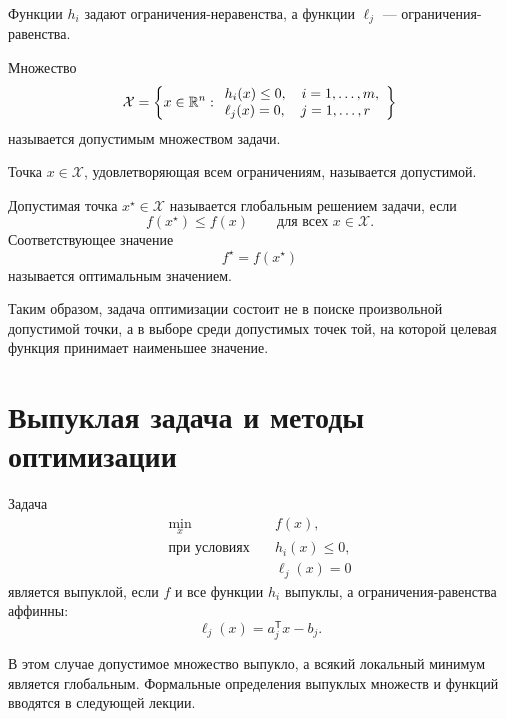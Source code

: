 Функции \(h_i\) задают ограничения-неравенства, а функции
\(\ell_j\) --- ограничения-равенства.

\begin{definition}
Множество
\[
    \mathcal X
    =
    \left\{
        x\in\mathbb{R}^n:
        \begin{array}{l}
            h_i(x)\le0,\quad i=1,\ldots,m,\\
            \ell_j(x)=0,\quad j=1,\ldots,r
        \end{array}
    \right\}
\]
называется допустимым множеством задачи.
\end{definition}

\begin{definition}
Точка \(x\in\mathcal X\), удовлетворяющая всем ограничениям,
называется допустимой.
\end{definition}

\begin{definition}
Допустимая точка \(x^\star\in\mathcal X\) называется глобальным
решением задачи, если
\[
    f(x^\star)\le f(x)
    \qquad
    \text{для всех }x\in\mathcal X.
\]
Соответствующее значение
\[
    f^\star=f(x^\star)
\]
называется оптимальным значением.
\end{definition}

Таким образом, задача оптимизации состоит не в поиске произвольной
допустимой точки, а в выборе среди допустимых точек той, на которой
целевая функция принимает наименьшее значение.

\section{Выпуклая задача и методы оптимизации}

Задача
\[
    \begin{aligned}
        \min_x
        \quad& f(x),
        \\
        \text{при условиях}
        \quad& h_i(x)\le0,
        \\
        & \ell_j(x)=0
    \end{aligned}
\]
является выпуклой, если \(f\) и все функции \(h_i\) выпуклы, а
ограничения-равенства аффинны:
\[
    \ell_j(x)=a_j^{\mathsf T}x-b_j.
\]

В этом случае допустимое множество выпукло, а всякий локальный
минимум является глобальным. Формальные определения выпуклых
множеств и функций вводятся в следующей лекции.



